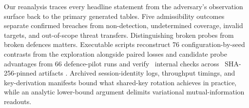 \documentclass[11pt]{article}
\begin{document}
Our reanalysis traces every headline statement from the adversary's
observation surface back to the primary generated tables. Five
admissibility outcomes separate confirmed breaches from non-detection,
undetermined coverage, invalid targets, and out-of-scope threat transfers.
Distinguishing broken probes from broken defences matters. Executable
scripts reconstruct 76 configuration-by-seed contrasts from the exploration
alongside paired losses and candidate probe advantages from 66
defence-pilot runs and verify \ConsistencyChecks\ internal checks across
\PinnedInputs\ SHA-256-pinned artifacts \cite{artifacts2026}. Archived
session-identity logs, throughput timings, and key-derivation manifests
bound what shared-key rotation achieves in practice, while an analytic
lower-bound argument delimits variational mutual-information readouts.






\appendix

\FloatBarrier


\end{document}
